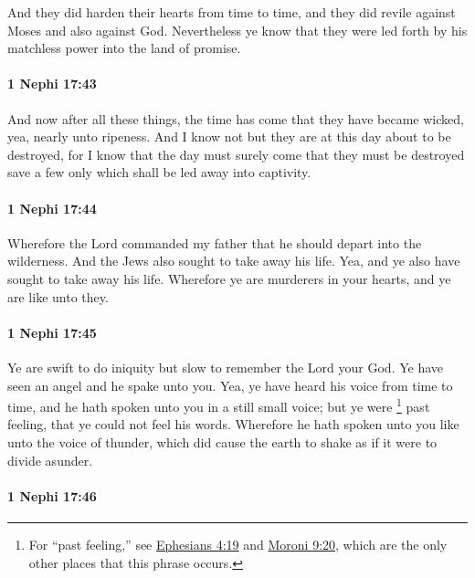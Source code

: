 			And they did harden their hearts from time to time,
			and they did revile against Moses and also against God.
			Nevertheless ye know that they were led forth
			by his matchless power into the land of promise.

		\paragraph{1 Nephi 17:43} %
			\label{1NEPHI-17-43}

			And now after all these things,
			the time has come that they have became wicked,
			yea, nearly unto ripeness.
			And I know not but they are at this day about to be destroyed,
			for I know that the day must surely come
			that they must be destroyed save a few only
			which shall be led away into captivity.

		\paragraph{1 Nephi 17:44} %
			\label{1NEPHI-17-44}

			Wherefore the Lord commanded my father
			that he should depart into the wilderness.
			And the Jews also sought to take away his life.
			Yea, and ye also have sought to take away his life.
			Wherefore ye are murderers in your hearts,
			and ye are like unto they.

		\paragraph{1 Nephi 17:45} %
			\label{1NEPHI-17-45}

			Ye are swift to do iniquity
			but slow to remember the Lord your God.
			Ye have seen an angel and he spake unto you.
			Yea, ye have heard his voice from time to time,
			and he hath spoken unto you in a still small voice;
			but ye were
				\footnote{%
					For ``past feeling,'' see \hyperref[EPHESIANS-4-19]{Ephesians 4:19} and \hyperref[MORONI-9-20]{Moroni 9:20}, which are the only other places that this phrase occurs.
					}%
			past feeling, that ye could not feel his words.
			Wherefore he hath spoken unto you like unto the voice of thunder,
			which did cause the earth to shake as if it were to divide asunder.

		\paragraph{1 Nephi 17:46} %
			\label{1NEPHI-17-46}

